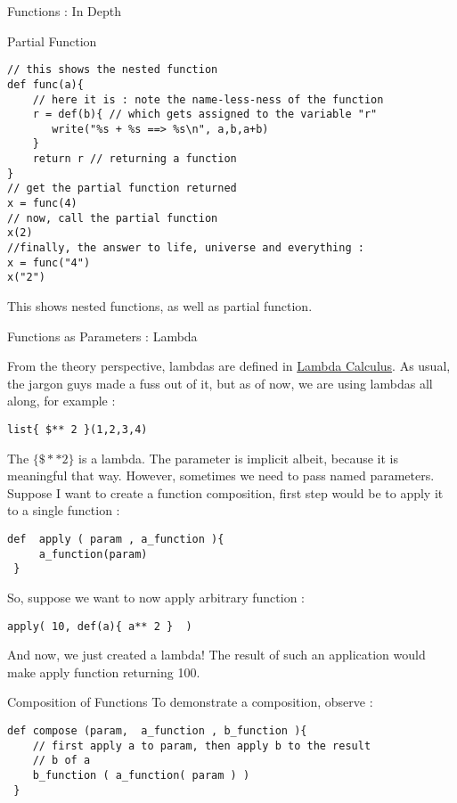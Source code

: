\begin{section}{Functions : In Depth}
\begin{subsection}{Partial Function}
\begin{lstlisting}[style=JexlStyle]
// this shows the nested function 
def func(a){
    // here it is : note the name-less-ness of the function
    r = def(b){ // which gets assigned to the variable "r"
       write("%s + %s ==> %s\n", a,b,a+b)
    }
    return r // returning a function 
}
// get the partial function returned 
x = func(4)
// now, call the partial function 
x(2)
//finally, the answer to life, universe and everything :
x = func("4")
x("2")
\end{lstlisting}
This shows nested functions, as well as partial function.
\end{subsection}

\begin{subsection}{Functions as Parameters : Lambda}

From the theory perspective, lambdas are defined in \href{https://en.wikipedia.org/wiki/Lambda_calculus}{Lambda Calculus}. 
As usual, the jargon guys made a fuss out of it, but as of now, we are using lambdas all along, for example :

\begin{lstlisting}[style=JexlStyle]
list{ $** 2 }(1,2,3,4)
\end{lstlisting}
 
The $\{ \$ ** 2 \}$ is a lambda. The parameter is implicit albeit, because it is meaningful that way. However, sometimes we need to pass named parameters. Suppose I want to create a function composition, first step would be to apply it to a single function :

\begin{lstlisting}[style=JexlStyle]
 def  apply ( param , a_function ){
     a_function(param)
 }
\end{lstlisting} 
So, suppose we want to now apply arbitrary function :
\begin{lstlisting}[style=JexlStyle]
 apply( 10, def(a){ a** 2 }  )
\end{lstlisting}
And now, we just created a lambda! The result of such an application would make apply function returning 100.
\end{subsection}


\begin{subsection}{Composition of Functions}
To demonstrate a composition, observe :

\begin{lstlisting}[style=JexlStyle]
def compose (param,  a_function , b_function ){
    // first apply a to param, then apply b to the result 
    // b of a 
    b_function ( a_function( param ) )
 }
\end{lstlisting}
 

\end{subsection}
\end{section}
